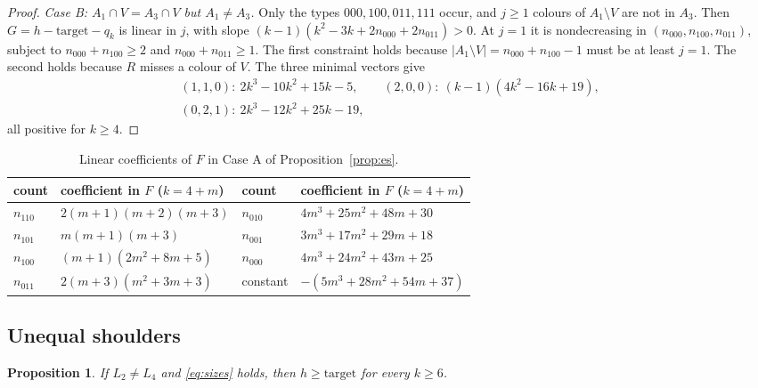 \documentclass[11pt]{amsart}
\newtheorem{proposition}[theorem]{Proposition}
\theoremstyle{definition}
\theoremstyle{remark}
\newcommand{\1}{\mathbf 1}
\begin{document}
\begin{proof}
\emph{Case B: $A_1\cap V=A_3\cap V$ but $A_1\ne A_3$.}
Only the types $000,100,011,111$ occur, and $j\ge1$ colours of $A_1\setminus V$ are not in $A_3$. Then
$G=h-\mathrm{target}-q_k$ is linear in $j$, with slope $(k-1)(k^2-3k+2n_{000}+2n_{011})>0$. At $j=1$ it is
nondecreasing in $(n_{000},n_{100},n_{011})$, subject to $n_{000}+n_{100}\ge2$ and $n_{000}+n_{011}\ge1$. The first constraint holds because
$|A_1\setminus V|=n_{000}+n_{100}-1$ must be at least $j=1$. The second holds because $R$ misses a colour
of $V$.
The three minimal vectors give
\begin{gather*}
(1,1,0):\ 2k^3-10k^2+15k-5,\qquad (2,0,0):\ (k-1)(4k^2-16k+19),\\ (0,2,1):\ 2k^3-12k^2+25k-19,
\end{gather*}
all positive for $k\ge4$.
\end{proof}

\begin{table}[ht]
\centering
\small
\begin{tabular}{@{}ll@{\qquad}ll@{}}
\toprule
count & coefficient in $F$ ($k=4+m$) & count & coefficient in $F$ ($k=4+m$)\\
\midrule
$n_{110}$ & $2(m+1)(m+2)(m+3)$ & $n_{010}$ & $4m^3+25m^2+48m+30$\\
$n_{101}$ & $m(m+1)(m+3)$ & $n_{001}$ & $3m^3+17m^2+29m+18$\\
$n_{100}$ & $(m+1)(2m^2+8m+5)$ & $n_{000}$ & $4m^3+24m^2+43m+25$\\
$n_{011}$ & $2(m+3)(m^2+3m+3)$ & constant & $-(5m^3+28m^2+54m+37)$\\
\bottomrule
\end{tabular}
\caption{Linear coefficients of $F$ in Case A of Proposition~\ref{prop:es}.}
\label{tab:esLinear}
\end{table}

\subsection{Unequal shoulders}
\begin{proposition}\label{prop:ues}
If $L_2\ne L_4$ and \eqref{eq:sizes} holds, then $h\ge\mathrm{target}$ for every $k\ge 6$.
\end{proposition}
\end{document}
